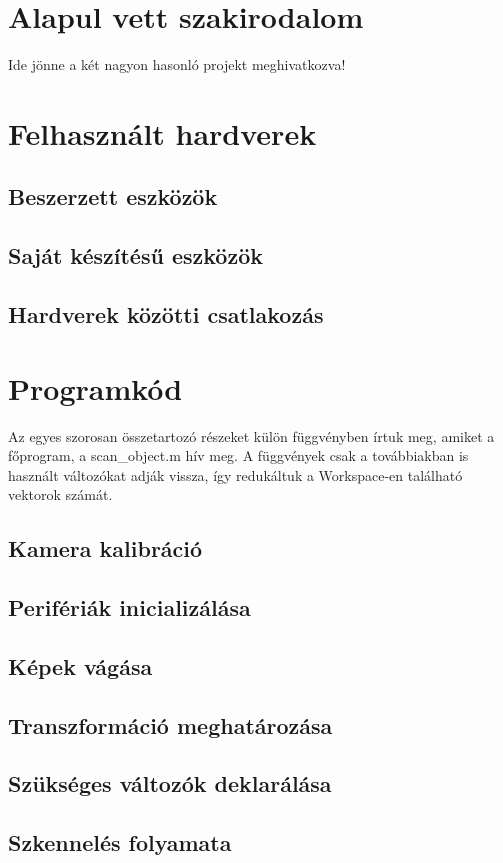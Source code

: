 \documentclass[12pt,a4paper]{article}
\begin{document}
\section{Alapul vett szakirodalom}
Ide jönne a két nagyon hasonló projekt meghivatkozva!
\section{Felhasznált hardverek}
\subsection{Beszerzett eszközök}
\subsection{Saját készítésű eszközök}
\subsection{Hardverek közötti csatlakozás}
\section{Programkód}
Az egyes szorosan összetartozó részeket külön függvényben írtuk meg, amiket a főprogram, a scan\_object.m hív meg. A függvények csak a továbbiakban is használt változókat adják vissza, így redukáltuk a Workspace-en található vektorok számát.
\subsection{Kamera kalibráció}
\subsection{Perifériák inicializálása}
\subsection{Képek vágása}
\subsection{Transzformáció meghatározása}
\subsection{Szükséges változók deklarálása}
\subsection{Szkennelés folyamata}
\end{document}
